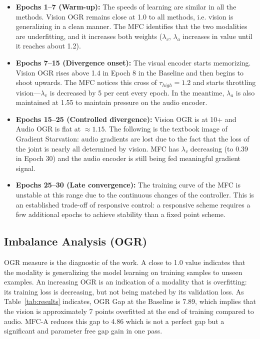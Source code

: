 \documentclass[fleqn,10pt]{wlscirep}
\begin{document}
\begin{itemize}
    \item \textbf{Epochs 1--7 (Warm-up):} The speeds of learning are similar in all the methods. Vision OGR remains close at 1.0 to all methods, i.e. vision is generalizing in a clean manner. The MFC identifies that the two modalities are underfitting, and it increases both weights ($\lambda_v$, $\lambda_a$ increases in value until it reaches about 1.2).

    \item \textbf{Epochs 7--15 (Divergence onset):} The visual encoder starts memorizing. Vision OGR rises above 1.4 in Epoch 8 in the Baseline and then begins to shoot upwards. The MFC notices this cross of $\tau_{high} = 1.2$ and starts throttling vision---$\lambda_v$ is decreased by 5 per cent every epoch. In the meantime, $\lambda_a$ is also maintained at 1.55 to maintain pressure on the audio encoder.

    \item \textbf{Epochs 15--25 (Controlled divergence):} Vision OGR is at 10+ and Audio OGR is flat at $\approx 1.15$. The following is the textbook image of Gradient Starvation: audio gradients are lost due to the fact that the loss of the joint is nearly all determined by vision. MFC has $\lambda_v$ decreasing (to 0.39 in Epoch 30) and the audio encoder is still being fed meaningful gradient signal.

    \item \textbf{Epochs 25--30 (Late convergence):} The training curve of the MFC is unstable at this range due to the continuous changes of the controller. This is an established trade-off of responsive control: a responsive scheme requires a few additional epochs to achieve stability than a fixed point scheme.
\end{itemize}

\subsection{Imbalance Analysis (OGR)}

OGR measure is the diagnostic of the work. A close to 1.0 value indicates that the modality is generalizing the model learning on training samples to unseen examples. An increasing OGR is an indication of a modality that is overfitting: its training loss is decreasing, but not being matched by its validation loss. As Table~\ref{tab:results} indicates, OGR Gap at the Baseline is 7.89, which implies that the vision is approximately 7 points overfitted at the end of training compared to audio. MFC-A reduces this gap to 4.86 which is not a perfect gap but a significant and parameter free gap gain in one pass.
\end{document}

